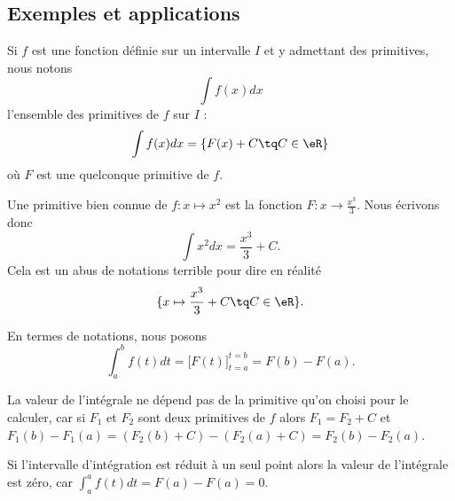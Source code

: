 \subsection{Exemples et applications}

Si \( f\) est une fonction définie sur un intervalle \( I\) et y admettant des primitives, nous notons
\begin{equation}
    \int f(x)dx
\end{equation}
l'ensemble des primitives de \( f\) sur \( I\) :
\begin{equation}
    \int f(x)dx=\left\{    F(x)+C\tq C\in \eR   \right\}
\end{equation}
où \( F\) est une quelconque primitive de \( f\).

\begin{example}
    Une primitive bien connue de \(  f\colon x\mapsto x^2 \) est la fonction \( F\colon x\to \frac{ x^3 }{ 3 }\). Nous écrivons donc
    \begin{equation}
        \int x^2dx=\frac{ x^3 }{ 3 }+C.
    \end{equation}
    Cela est un abus de notations terrible pour dire en réalité
    \begin{equation}
        \{ x\mapsto \frac{ x^3 }{ 3 }+C\tq C\in \eR \}.
    \end{equation}
\end{example}

En termes de notations, nous posons
\begin{equation}\label{Thfondcalc}
    \int_a^bf(t)dt=\Big[ F(t) \Big]_{t=a}^{t=b}=F(b)-F(a).
\end{equation}

\begin{remark}
  La valeur de l'intégrale ne dépend pas de la primitive qu'on choisi pour le calculer, car si $F_1$ et $F_2$ sont deux primitives de $f$ alors $F_1 = F_2 + C$ et $F_1(b)-F_1(a) = (F_2(b) + C)-(F_2(a)+C) = F_2(b)-F_2(a)$.
\end{remark}

\begin{remark}
  Si l'intervalle d'intégration est réduit à un seul point alors la valeur de l'intégrale est zéro, car $ \int_a^af(t)dt=F(a)-F(a) =0$.
\end{remark}

